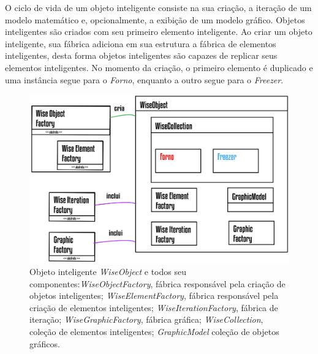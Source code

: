 
O ciclo de vida de um objeto inteligente consiste na sua criação, a iteração de um modelo matemático e, opcionalmente, a exibição de um modelo gráfico. Objetos inteligentes são criados com seu primeiro elemento inteligente. Ao criar um objeto inteligente, sua fábrica adiciona em sua estrutura a fábrica de elementos inteligentes, desta forma objetos inteligentes são capazes de replicar seus elementos inteligentes. No momento da criação, o primeiro elemento é duplicado e uma instância segue para o \textit{Forno}, enquanto a outro segue para o \textit{Freezer}.

\begin{figure}[!htbp]
	\centering
	\includegraphics[scale=1.15]{Figures/WiseObject@16x.png}
	\caption{Objeto inteligente \textit{WiseObject} e todos seu componentes:\textit{WiseObjectFactory}, fábrica responsável pela criação de objetos inteligentes; \textit{WiseElementFactory}, fábrica responsável pela criação de elementos inteligentes; \textit{WiseIterationFactory}, fábrica de iteração; \textit{WiseGraphicFactory}, fábrica gráfica; \textit{WiseCollection}, coleção de elementos inteligentes; \textit{GraphicModel} coleção de objetos gráficos.}
	\label{fig7:wiseobject}
\end{figure}

